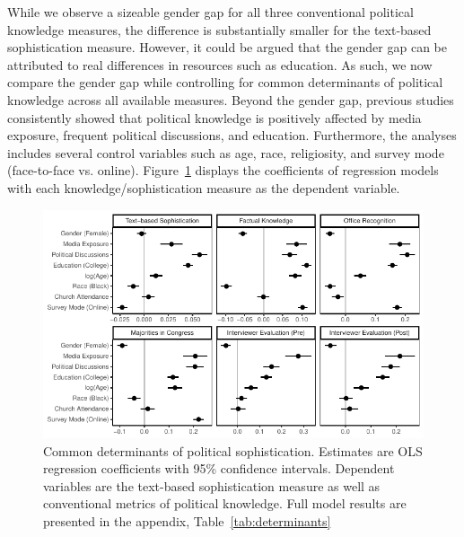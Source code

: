\documentclass[12pt]{article}
\begin{document}
While we observe a sizeable gender gap for all three conventional political knowledge measures, the difference is substantially smaller for the text-based sophistication measure. However, it could be argued that the gender gap can be attributed to real differences in resources such as education. As such, we now compare the gender gap while controlling for common determinants of political knowledge across all available measures. Beyond the gender gap, previous studies consistently showed that political knowledge is positively affected by media exposure, frequent political discussions, and education. Furthermore, the analyses includes several control variables such as age, race, religiosity, and survey mode (face-to-face vs. online). Figure~\ref{fig:determinants} displays the coefficients of regression models with each knowledge/sophistication measure as the dependent variable.

\begin{figure}[h]\centering
\includegraphics{../fig/determinants.pdf}
\caption{Common determinants of political sophistication. Estimates are OLS regression coefficients with 95\% confidence intervals. Dependent variables are the text-based sophistication measure as well as conventional metrics of political knowledge. Full model results are presented in the appendix, Table~\ref{tab:determinants}}\label{fig:determinants}
\end{figure}
\end{document}
